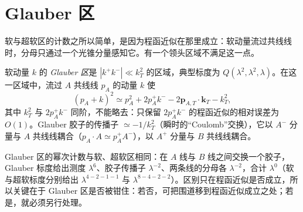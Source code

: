 \section{Glauber 区}\label{sec:ir-glauber}

软与超软区的计数之所以简单，是因为程函近似在那里成立：软动量流过共线线时，分母只通过一个光锥分量感知它。有一个领头区域不满足这一点。

\begin{definition}[Glauber 区]\label{def:ir-glauber}
软动量 $k$ 的 \emph{Glauber 区}是 $|k^+k^-|\ll k_T^2$ 的区域，典型标度为 $Q(\lambda^2,\lambda^2,\lambda)$。在这一区域中，流过 $A$ 共线线 $p_A$ 的动量 $k$ 使
\begin{equation}\label{eq:ir-glauber-denom}
(p_A+k)^2\simeq p_A^2+2p_A^+k^--2\mathbf p_{A,T}\cdot\mathbf k_T-k_T^2 ,
\end{equation}
其中 $k_T^2$ 与 $2p_A^+k^-$ 同阶，不能略去：只保留 $2p_A^+k^-$ 的程函近似的相对误差为 $O(1)$。Glauber 胶子的传播子 $\simeq-1/k_T^2$（瞬时的“Coulomb”交换），它以 $A^-$ 分量与 $A$ 共线线耦合（$p_A\cdot A\simeq p_A^+A^-$），以 $A^+$ 分量与 $B$ 共线线耦合。
\end{definition}

Glauber 区的幂次计数与软、超软区相同：在 $A$ 线与 $B$ 线之间交换一个胶子，Glauber 标度给出测度 $\lambda^6$、胶子传播子 $\lambda^{-2}$、两条线的分母各 $\lambda^{-2}$，合计 $\lambda^0$（软与超软标度分别给出 $\lambda^{4-2-1-1}$ 与 $\lambda^{8-4-2-2}$）。区别只在程函近似是否成立，所以关键在于 Glauber 区是否被钳住：若否，可把围道移到程函近似成立之处；若是，就必须另行处理。

